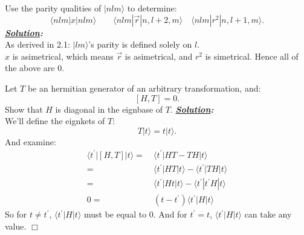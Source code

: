\documentclass[notitlepage]{report}
\begin{document}
\begin{question}[title = Question 2.2]{}{}
Use the parity qualities of $|nlm\rangle $ to determine:\\
\[
	\langle nlm|x|nlm\rangle\qquad\langle nlm|\vec{r}|n,l+2,m\rangle\quad\langle nlm|r^2|n,l+1,m\rangle    
.\] 
\tcblower
\textbf{\emph{\underline{Solution}:}}\\
As derived in 2.1: ${|lm\rangle}$'s parity is defined solely on $l$.\\
$x$ is asimetrical, which means  $\vec{r}$ is asimetrical, and $r^2$ is simetrical. Hence all of the above are 0.
\end{question}

\begin{question}[title = Question 3]{}{}
Let $T$ be an hermitian generator of an arbitrary transformation, and:\\
\[
	\left[H,T\right]=0 
.\] 
Show that $H$ is diagonal in the eignbase of $T$.
\tcblower
\textbf{\emph{\underline{Solution}:}}\\
We'll define the eignkets of $T $:\\
 \[
	T|t\rangle=t|t\rangle  
.\] 
And examine:\\
\begin{align*}
\langle t^{\prime}|\left[H,T\right]|t\rangle =&\ \langle t^{\prime}|HT-TH|t\rangle \\
=&\ \langle t^{\prime}|HT|t\rangle-\langle t^{\prime}|TH|t\rangle \\
=&\ \langle t^{\prime}|Ht|t\rangle-\langle t^{\prime}|t^{\prime}H|t\rangle \\
0=&\ \left(t-t^{\prime}\right)  \langle t^{\prime}|H|t\rangle
\end{align*}
So for $t\ne t^{\prime}$, $\langle t^{\prime}|H|t\rangle $ must be equal to 0. And for $t^{\prime}=t$, $\langle t^{\prime}|H|t\rangle$ can take any value.  $\Box$
\end{question}
\newpage
\end{document}
